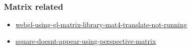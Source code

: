 \subsubsection{Matrix related}\label{matrix-related}

\begin{itemize}
\tightlist
\item
  \href{http://stackoverflow.com/questions/14784427/webgl-using-gl-matrix-library-mat4-translate-not-running}{webgl-using-gl-matrix-library-mat4-translate-not-running}
\item
  \href{http://stackoverflow.com/questions/17345432/square-doesnt-appear-using-perspective-matrix}{square-doesnt-appear-using-perspective-matrix}
\end{itemize}

